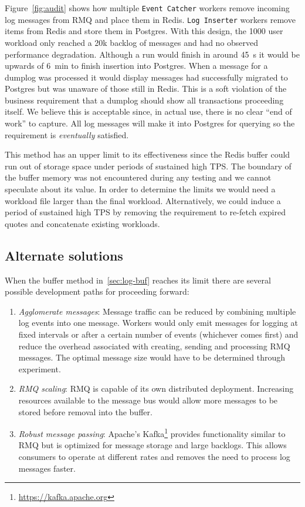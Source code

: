 Figure~\ref{fig:audit} shows how multiple \texttt{Event Catcher} workers remove incoming log messages from RMQ and place them in Redis. \texttt{Log Inserter} workers remove items from Redis and store them in Postgres.
With this design, the 1000 user workload only reached a 20k backlog of messages and had no observed performance degradation.
Although a run would finish in around \SI{45}{\second} it would be upwards of \SI{6}{\minute} to finish insertion into Postgres.
When a message for a dumplog was processed it would display messages had successfully migrated to Postgres but was unaware of those still in Redis.
This is a soft violation of the business requirement that a dumplog should show all transactions proceeding itself.
We believe this is acceptable since, in actual use, there is no clear ``end of work'' to capture.
All log messages will make it into Postgres for querying so the requirement is \textit{eventually} satisfied.

This method has an upper limit to its effectiveness since the Redis buffer could run out of storage space under periods of sustained high TPS.
The boundary of the buffer memory was not encountered during any testing and we cannot speculate about its value.
In order to determine the limits we would need a workload file larger than the final workload.
Alternatively, we could induce a period of sustained high TPS by removing the requirement to re-fetch expired quotes and concatenate existing workloads.

\subsection{Alternate solutions}
When the buffer method in~\ref{sec:log-buf} reaches its limit there are several possible development paths for proceeding forward:

\begin{enumerate}
  \item \textit{Agglomerate messages}: Message traffic can be reduced by combining multiple log events into one message.
Workers would only emit messages for logging at fixed intervals or after a certain number of events (whichever comes first) and reduce the overhead associated with creating, sending and processing RMQ messages.
The optimal message size would have to be determined through experiment.
  \item \textit{RMQ scaling}: RMQ is capable of its own distributed deployment.
Increasing resources available to the message bus would allow more messages to be stored before removal into the buffer.
  \item \textit{Robust message passing}: Apache's Kafka\footnote{\url{https://kafka.apache.org}} provides functionality similar to RMQ but is optimized for message storage and large backlogs.
This allows consumers to operate at different rates and removes the need to process log messages faster.
\end{enumerate}
